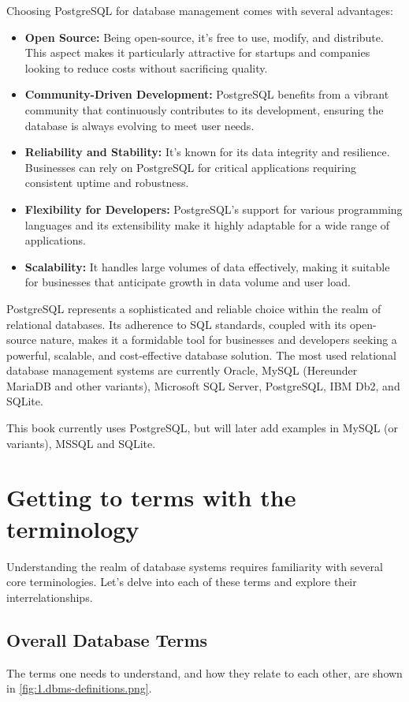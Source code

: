Choosing PostgreSQL for database management comes with several advantages:

\begin{itemize}
    \item \textbf{Open Source:} Being open-source, it's free to use, modify, and distribute. This aspect makes it particularly attractive for startups and companies looking to reduce costs without sacrificing quality.
    \item \textbf{Community-Driven Development:} PostgreSQL benefits from a vibrant community that continuously contributes to its development, ensuring the database is always evolving to meet user needs.
    \item \textbf{Reliability and Stability:} It's known for its data integrity and resilience. Businesses can rely on PostgreSQL for critical applications requiring consistent uptime and robustness.
    \item \textbf{Flexibility for Developers:} PostgreSQL's support for various programming languages and its extensibility make it highly adaptable for a wide range of applications.
    \item \textbf{Scalability:} It handles large volumes of data effectively, making it suitable for businesses that anticipate growth in data volume and user load.
\end{itemize}

PostgreSQL represents a sophisticated and reliable choice within the realm of relational databases. Its adherence to SQL standards, coupled with its open-source nature, makes it a formidable tool for businesses and developers seeking a powerful, scalable, and cost-effective database solution. The most used relational database management systems are currently Oracle, MySQL (Hereunder MariaDB and other variants), Microsoft SQL Server, PostgreSQL, IBM Db2, and SQLite.

This book currently uses PostgreSQL, but will later add examples in MySQL (or variants), MSSQL and SQLite.


\section{Getting to terms with the terminology}
Understanding the realm of database systems requires familiarity with several core terminologies. Let's delve into each of these terms and explore their interrelationships.

\subsection{Overall Database Terms}
The terms one needs to understand, and how they relate to each other, are shown in \cref{fig:1.dbms-definitions.png}.


